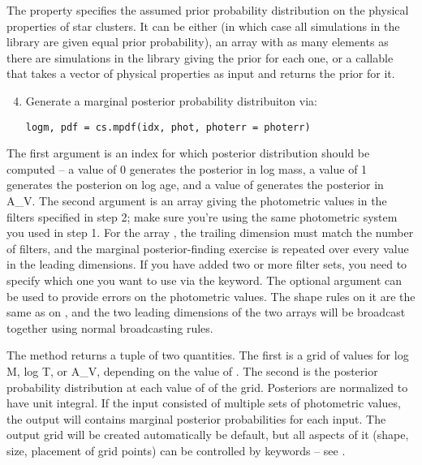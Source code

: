 \documentclass[letterpaper,10pt,english]{sphinxmanual}
\begin{document}
The  property specifies the assumed prior probability distribution on the physical properties of star clusters. It can be either  (in which case all simulations in the library are given equal prior probability), an array with as many elements as there are simulations in the library giving the prior for each one, or a callable that takes a vector of physical properties as input and returns the prior for it.
\begin{enumerate}
\setcounter{enumi}{3}
\item {} 
Generate a marginal posterior probability distribuiton via:

\begin{Verbatim}[commandchars=\\\{\}]
logm, pdf = cs.mpdf(idx, phot, photerr = photerr)
\end{Verbatim}

\end{enumerate}

The first argument  is an index for which posterior distribution should be computed -- a value of 0 generates the posterior in log mass, a value of 1 generates the posterion on log age, and a value of generates the posterior in A\_V. The second argument  is an array giving the photometric values in the filters specified in step 2; make sure you're using the same photometric system you used in step 1. For the array , the trailing dimension must match the number of filters, and the marginal posterior-finding exercise is repeated over every value in the leading dimensions. If you have added two or more filter sets, you need to specify which one you want to use via the  keyword. The optional argument  can be used to provide errors on the photometric values. The shape rules on it are the same as on , and the two leading dimensions of the two arrays will be broadcast together using normal broadcasting rules.

The  method returns a tuple of two quantities. The first is a grid of values for log M, log T, or A\_V, depending on the value of . The second is the posterior probability distribution at each value of of the grid. Posteriors are normalized to have unit integral. If the input consisted of multiple sets of photometric values, the output will contains marginal posterior probabilities for each input. The output grid will be created automatically be default, but all aspects of it (shape, size, placement of grid points) can be controlled by keywords -- see {\hyperref[cluster_slug:ssec-cluster-slug-full]{\emph{}}}.
\end{document}
